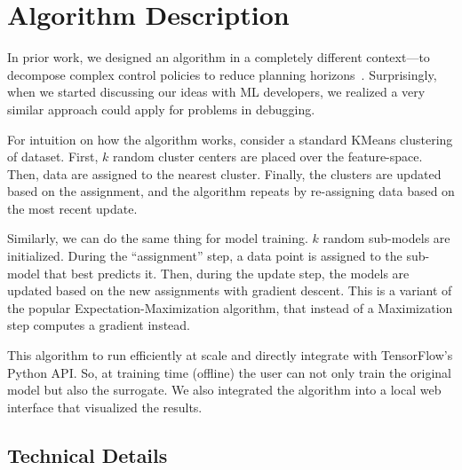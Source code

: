 \section{Algorithm Description}
In prior work, we designed an algorithm in a completely different context---to decompose complex control policies to reduce planning horizons~\cite{DBLP:journals/corr/KrishnanGLMPG16, krishnan17}. Surprisingly, when we started discussing our ideas with ML developers, we realized a very similar approach could apply for problems in debugging. 

For intuition on how the algorithm works, consider a standard KMeans clustering of dataset. First, $k$ random cluster centers are placed over the feature-space. Then, data are assigned to the nearest cluster. Finally, the clusters are updated based on the assignment, and the algorithm repeats by re-assigning data based on the most recent update.

Similarly, we can do the same thing for model training. $k$ random sub-models are initialized.
During the ``assignment'' step, a data point is assigned to the sub-model that best predicts it.
Then, during the update step, the models are updated based on the new assignments with gradient descent.
This is a variant of the popular Expectation-Maximization algorithm, that instead of a Maximization step computes a gradient instead. 

This algorithm to run efficiently at scale and directly integrate with TensorFlow's Python API.
So, at training time (offline) the user can not only train the original model but also the surrogate.
We also integrated the algorithm into a local web interface that visualized the results.


\subsection{Technical Details}

